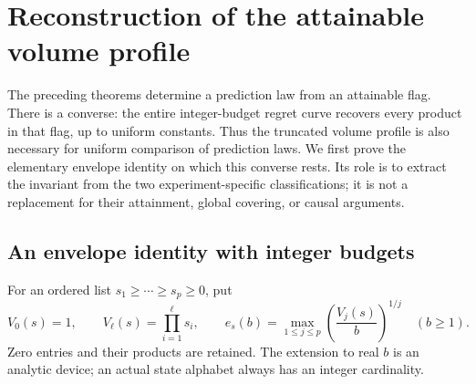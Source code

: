 \section{Reconstruction of the attainable volume profile}
\label{sec:operational-reconstruction}
The preceding theorems determine a prediction law from an attainable
flag. There is a converse: the entire integer-budget regret curve
recovers every product in that flag, up to uniform constants. Thus the
truncated volume profile is also necessary for uniform comparison of
prediction laws. We first prove the elementary envelope identity on
which this converse rests. Its role is to extract the invariant from
the two experiment-specific classifications; it is not a replacement
for their attainment, global covering, or causal arguments.

\subsection{An envelope identity with integer budgets}
For an ordered list $s_1\ge\cdots\ge s_p\ge0$, put
\[
 V_0(s)=1,\qquad V_\ell(s)=\prod_{i=1}^{\ell}s_i,
 \qquad
 e_s(b)=\max_{1\le j\le p}\left(\frac{V_j(s)}b\right)^{1/j}
 \quad(b\ge1).
\]
Zero entries and their products are retained. The extension to real
$b$ is an analytic device; an actual state alphabet always has an
integer cardinality.

